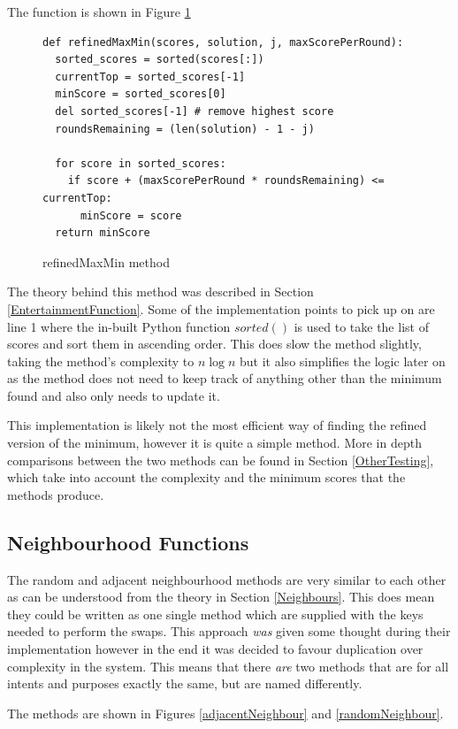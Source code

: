 \documentclass[12pt]{report}
\begin{document}
The function is shown in Figure \ref{refMaxMin}

\begin{figure}[H]
\caption{refinedMaxMin method}
\label{refMaxMin}
\begin{lstlisting}
def refinedMaxMin(scores, solution, j, maxScorePerRound):
  sorted_scores = sorted(scores[:])
  currentTop = sorted_scores[-1]
  minScore = sorted_scores[0]
  del sorted_scores[-1] # remove highest score
  roundsRemaining = (len(solution) - 1 - j)

  for score in sorted_scores:
    if score + (maxScorePerRound * roundsRemaining) <= currentTop:
      minScore = score
  return minScore
\end{lstlisting}
\end{figure}

The theory behind this method was described in Section \ref{EntertainmentFunction}. Some of the implementation points to pick up on are line 1 where the in-built Python function $sorted()$\cite{PythonSorted} is used to take the list of scores and sort them in ascending order. This does slow the method slightly, taking the method's complexity to $n \log n$ but it also simplifies the logic later on as the method does not need to keep track of anything other than the minimum found and also only needs to update it.

This implementation is likely not the most efficient way of finding the refined version of the minimum, however it is quite a simple method. More in depth comparisons between the two methods can be found in Section \ref{OtherTesting}, which take into account the complexity and the minimum scores that the methods produce.

\subsection{Neighbourhood Functions}\label{Imp-Neighbours}
The random and adjacent neighbourhood methods are very similar to each other as can be understood from the theory in Section \ref{Neighbours}. This does mean they could be written as one single method which are supplied with the keys needed to perform the swaps. This approach \textit{was} given some thought during their implementation however in the end it was decided to favour duplication over complexity in the system. This means that there \textit{are} two methods that are for all intents and purposes exactly the same, but are named differently.

The methods are shown in Figures \ref{adjacentNeighbour} and \ref{randomNeighbour}.
\end{document}
